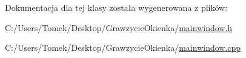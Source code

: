 Dokumentacja dla tej klasy została wygenerowana z plików\+:\begin{DoxyCompactItemize}
\item 
C\+:/\+Users/\+Tomek/\+Desktop/\+Grawzycie\+Okienka/\hyperlink{mainwindow_8h}{mainwindow.\+h}\item 
C\+:/\+Users/\+Tomek/\+Desktop/\+Grawzycie\+Okienka/\hyperlink{mainwindow_8cpp}{mainwindow.\+cpp}\end{DoxyCompactItemize}
